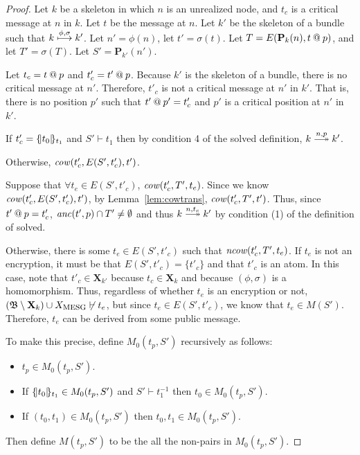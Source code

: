 \documentclass[12pt]{article}
\theoremstyle{definition}
\newcommand{\scap}[1]{\ensuremath{\mathop{\relax
                    \smash{\mbox{\sc#1}}}\!\mathop{\vphantom{#1}}\nolimits}}
\newcommand{\base}{\ensuremath{\mathfrak B}}
\newcommand{\solve}[1]{\stackrel{#1}{\longtwoheadrightarrow}}
\newcommand{\pubmsg}{\mathbf{P}}
\newcommand{\excl}{\mathbf{X}}
\newcommand{\anc}{\fn{anc}}
\newcommand{\mcow}{\fn{cow}}
\newcommand{\mncow}{\fn{ncow}}
\begin{document}
\begin{proof}
Let $k$ be a skeleton in which $n$ is an unrealized node, and $t_c$ is a
critical message at $n$ in $k$.  Let $t$ be the message at $n$.  Let $k'$ be the
skeleton of a bundle such that $k \stackrel{\phi,\sigma}{\longmapsto} k'$.
Let $n' = \phi(n)$, let $t' = \sigma(t)$.
Let $T = E(\pubmsg_k(n),t \termat p)$, and let $T' = \sigma(T)$.  Let $S' = \pubmsg_{k'}(n')$.

Let $t_c = t \mathbin{@} p$ and $t'_c = t' \mathbin{@} p$.
Because $k'$ is the skeleton of a bundle, there is no critical message at $n'$.  Therefore,
$t'_c$ is not a critical message at $n'$ in $k'$.  That is, there is no position $p'$ such that
$t' \mathbin{@} p' = t'_c$ and $p'$ is a critical position at $n'$ in $k'$.

If $t'_c = \{\!|t_0|\!\}_{t_1}$ and $S' \vdash t_1$ then by condition 4 of the solved definition,
$k\solve{n,p}k'$.

Otherwise, $\mcow(t'_c, E(S',t'_c), t')$.

Suppose that $\forall t_e \in E(S',t'_c)$, $\mcow(t'_c, T', t_e)$.  Since we know $\mcow(t'_c, E(S', t'_c), t')$,
by Lemma~\ref{lem:cowtrans}, $\mcow(t'_c, T', t')$.  Thus, since $t' \mathbin{@} p = t'_c$, $\anc(t',p) \cap T' \neq \emptyset$
and thus $k\solve{n,t_c}k'$ by condition (1) of the definition of solved.

Otherwise, there is some $t_e \in E(S', t'_c)$ such that $\mncow(t'_c, T', t_e)$.  If $t_e$ is not an encryption,
it must be that $E(S', t'_c) = \{ t'_c \}$ and that $t'_c$ is an atom.  In this case, note that $t'_c \in \excl_{k'}$
because $t_c \in \excl_k$ and because $(\phi,\sigma)$ is a homomorphism.  Thus, regardless of whether $t_e$ is an
encryption or not, $(\base\setminus\excl_k)\cup X_{\scap{mesg}} \not\vdash t_e$, but since $t_e \in E(S', t'_c)$, we know
that $t_e \in M(S')$.  Therefore, $t_e$ can be derived from some public message.

To make this precise, define $M_0(t_p,S')$ recursively as follows:

\begin{itemize}
\item $t_p \in M_0(t_p,S')$.
\item If $\{\!|t_0|\!\}_{t_1} \in M_0(t_p,S')$ and $S' \vdash t_1^{-1}$ then $t_0 \in M_0(t_p,S')$.
\item If $(t_0, t_1) \in M_0(t_p,S')$ then $t_0, t_1 \in M_0(t_p,S')$.
\end{itemize}

Then define $M(t_p,S')$ to be the all the non-pairs in $M_0(t_p,S')$.


\end{proof}
\end{document}
